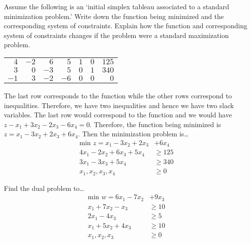 \documentclass[11pt,letterpaper]{article}
\begin{document}
\newpage



 Assume the following is an `initial simplex tableau associated to a standard minimization problem.' Write down the function being minimized and the corresponding system of constraints. Explain how the function and corresponding system of constraints changes if the problem were a standard maximization problem.
	\begin{table}[!ht]
	\centering
	\begin{tabular}{rrrrrr|r}
	$4$ & $-2$ & $6$ & $5$ & $1$ & $0$ & $125$ \\
	$3$ & $0$ & $-3$ & $5$ & $0$ & $1$ & $340$ \\ \hline
	$-1$ & $3$ & $-2$ & $-6$ & $0$ & $0$ & $0$ 
	\end{tabular}
	\end{table} \pspace

\sol The last row corresponds to the function while the other rows correspond to inequalities. Therefore, we have two inequalities and hence we have two slack variables. The last row would correspond to the function and we would have $z - x_1 + 3x_2 - 2x_3 - 6x_4= 0$. Therefore, the function being minimized is $z= x_1 - 3x_2 + 2x_3 + 6x_4$. Then the minimization problem is\dots
	\[
	\begin{aligned}
	\text{min } z= x_1 - 3x_2 + 2x_3 &+ 6x_4 \\
	4x_1 - 2x_2 + 6x_3 + 5x_4&\geq 125 \\
	3x_1 - 3x_3 + 5x_4&\geq 340 \\
	x_1, x_2, x_3, x_4&\geq 0
	\end{aligned}
	\]



\newpage



 Find the dual problem to\dots
	\[
	\begin{aligned}
	\text{min } w= 6x_1 - 7x_2 &+ 9x_3 \\
	x_1 + 7x_2 - x_3&\geq 10 \\
	2x_1 - 4x_3&\geq 5 \\
	x_1 + 5x_2 + 4x_3&\geq 10 \\
	x_1, x_2, x_3&\geq 0 
	\end{aligned}
	\] \pspace
\end{document}
